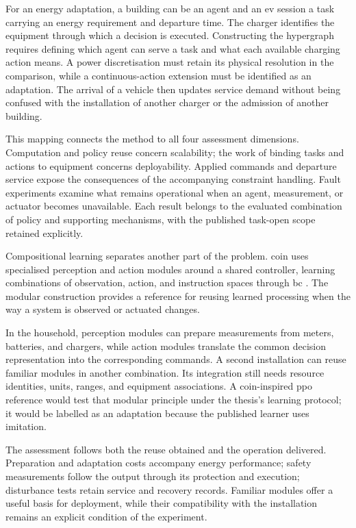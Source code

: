 For an energy adaptation, a building can be an agent and an \gls{ev} session a task carrying an energy requirement and departure time. The charger identifies the equipment through which a decision is executed. Constructing the hypergraph requires defining which agent can serve a task and what each available charging action means. A power discretisation must retain its physical resolution in the comparison, while a continuous-action extension must be identified as an adaptation. The arrival of a vehicle then updates service demand without being confused with the installation of another charger or the admission of another building.

This mapping connects the method to all four assessment dimensions. Computation and policy reuse concern scalability; the work of binding tasks and actions to equipment concerns deployability. Applied commands and departure service expose the consequences of the accompanying constraint handling. Fault experiments examine what remains operational when an agent, measurement, or actuator becomes unavailable. Each result belongs to the evaluated combination of policy and supporting mechanisms, with the published task-open scope retained explicitly.

Compositional learning separates another part of the problem. \gls{coin} uses specialised perception and action modules around a shared controller, learning combinations of observation, action, and instruction spaces through \gls{bc} \parencite{luketina2025compositional}. The modular construction provides a reference for reusing learned processing when the way a system is observed or actuated changes.

In the household, perception modules can prepare measurements from meters, batteries, and chargers, while action modules translate the common decision representation into the corresponding commands. A second installation can reuse familiar modules in another combination. Its integration still needs resource identities, units, ranges, and equipment associations. A \gls{coin}-inspired \gls{ppo} reference would test that modular principle under the thesis's learning protocol; it would be labelled as an adaptation because the published learner uses imitation.

The assessment follows both the reuse obtained and the operation delivered. Preparation and adaptation costs accompany energy performance; safety measurements follow the output through its protection and execution; disturbance tests retain service and recovery records. Familiar modules offer a useful basis for deployment, while their compatibility with the installation remains an explicit condition of the experiment.


